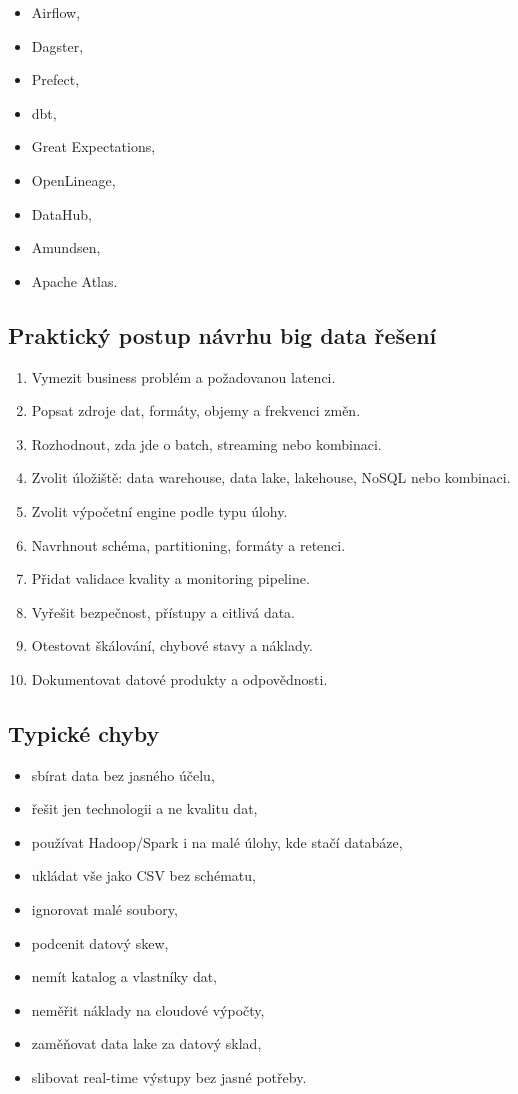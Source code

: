 \begin{itemize}
    \item Airflow,
    \item Dagster,
    \item Prefect,
    \item dbt,
    \item Great Expectations,
    \item OpenLineage,
    \item DataHub,
    \item Amundsen,
    \item Apache Atlas.
\end{itemize}

\subsection{Praktický postup návrhu big data řešení}

\begin{enumerate}
    \item Vymezit business problém a požadovanou latenci.
    \item Popsat zdroje dat, formáty, objemy a frekvenci změn.
    \item Rozhodnout, zda jde o batch, streaming nebo kombinaci.
    \item Zvolit úložiště: data warehouse, data lake, lakehouse, NoSQL nebo kombinaci.
    \item Zvolit výpočetní engine podle typu úlohy.
    \item Navrhnout schéma, partitioning, formáty a retenci.
    \item Přidat validace kvality a monitoring pipeline.
    \item Vyřešit bezpečnost, přístupy a citlivá data.
    \item Otestovat škálování, chybové stavy a náklady.
    \item Dokumentovat datové produkty a odpovědnosti.
\end{enumerate}

\subsection{Typické chyby}

\begin{itemize}
    \item sbírat data bez jasného účelu,
    \item řešit jen technologii a ne kvalitu dat,
    \item používat Hadoop/Spark i na malé úlohy, kde stačí databáze,
    \item ukládat vše jako CSV bez schématu,
    \item ignorovat malé soubory,
    \item podcenit datový skew,
    \item nemít katalog a vlastníky dat,
    \item neměřit náklady na cloudové výpočty,
    \item zaměňovat data lake za datový sklad,
    \item slibovat real-time výstupy bez jasné potřeby.
\end{itemize}

